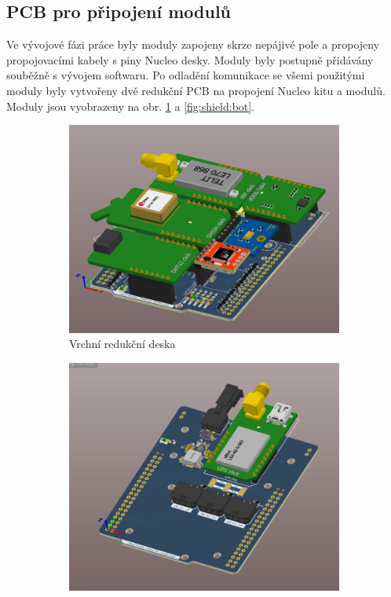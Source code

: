 \documentclass[twoside]{ctuthesis}
\theoremstyle{plain}
\theoremstyle{definition}
\theoremstyle{note}
\begin{document}
		
		\subsection{PCB pro připojení modulů}
		Ve vývojové fázi práce byly moduly zapojeny skrze nepájivé pole a propojeny propojovacími kabely s piny Nucleo desky. Moduly byly postupně přidávány souběžně s vývojem softwaru. Po odladění komunikace se všemi použitými moduly byly vytvořeny dvě redukční PCB na propojení Nucleo kitu a modulů. Moduly jsou vyobrazeny na obr. \ref{fig:shield:top} a \ref{fig:shield:bot}. 

		\begin{figure}[hbtp]
			\centering
			\begin{subfigure}{0.3\textwidth}
				\centering
				\includegraphics[height=0.7\linewidth]{Figures/shield_top.png} 
				\caption{Vrchní redukční deska}
				\label{fig:shield:top}
			\end{subfigure}%
			\begin{subfigure}{.3\textwidth}
				\centering
				\includegraphics[height=0.7\linewidth]{Figures/shield_bot.png}

\end{subfigure}
\end{figure}
\end{document}
